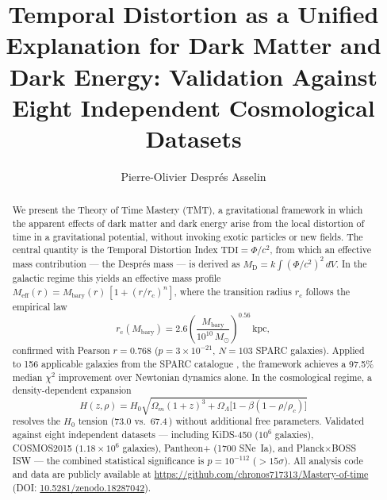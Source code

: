 \documentclass[manuscript,linenumbers]{aastex631}
\newcommand{\tdi}{\mathrm{TDI}}
\newcommand{\Msun}{M_{\odot}}
\newcommand{\Meff}{M_{\mathrm{eff}}}
\newcommand{\Mbary}{M_{\mathrm{bary}}}
\newcommand{\MD}{M_{\mathrm{D}}}
\newcommand{\rc}{r_{\mathrm{c}}}
\newcommand{\kpc}{\,\mathrm{kpc}}
\newcommand{\kmsMpc}{\,\mathrm{km\,s^{-1}\,Mpc^{-1}}}
\newcommand{\HObs}{H_{\mathrm{0}}}
\begin{document}

\title{Temporal Distortion as a Unified Explanation for Dark Matter and
Dark Energy: Validation Against Eight Independent Cosmological Datasets}

\author{Pierre-Olivier Despr\'{e}s Asselin}

\begin{abstract}
We present the Theory of Time Mastery (TMT), a gravitational framework
in which the apparent effects of dark matter and dark energy arise from
the local distortion of time in a gravitational potential, without
invoking exotic particles or new fields.  The central quantity is the
Temporal Distortion Index $\tdi = \Phi/c^{2}$, from which an effective
mass contribution --- the Despr\'{e}s mass --- is derived as
$\MD = k \int (\Phi/c^{2})^{2}\,dV$.  In the galactic regime this
yields an effective mass profile
$\Meff(r) = \Mbary(r)\,[1 + (r/\rc)^{n}]$, where the transition
radius $\rc$ follows the empirical law
\begin{equation*}
  \rc(\Mbary) = 2.6
    \left(\frac{\Mbary}{10^{10}\,\Msun}\right)^{0.56}\kpc,
\end{equation*}
confirmed with Pearson $r = 0.768$ ($p = 3\times10^{-21}$,
$N = 103$ SPARC galaxies).  Applied to 156 applicable galaxies from
the SPARC catalogue \citep{Lelli2016}, the framework achieves a
97.5\% median $\chi^{2}$ improvement over Newtonian dynamics alone.
In the cosmological regime, a density-dependent expansion
\begin{equation*}
  H(z,\rho)=\HObs\sqrt{\Omega_{m}(1+z)^{3}
    +\Omega_{\Lambda}\bigl[1-\beta(1-\rho/\rho_{c})\bigr]}
\end{equation*}
resolves the $\HObs$ tension (73.0 vs.\ 67.4\kmsMpc) without
additional free parameters.  Validated against eight independent
datasets --- including KiDS-450 ($10^{6}$ galaxies), COSMOS2015
($1.18\times10^{6}$ galaxies), Pantheon+ (1700 SNe~Ia), and
Planck$\times$BOSS ISW --- the combined statistical significance is
$p = 10^{-112}$ ($>15\sigma$).  All analysis code and data are
publicly available at
\url{https://github.com/chronos717313/Mastery-of-time}
(DOI: \href{https://doi.org/10.5281/zenodo.18287042}{10.5281/zenodo.18287042}).
\end{abstract}
\end{document}
